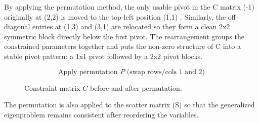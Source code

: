 By applying the permutation method, the only usable pivot in the C matrix (-1) originally at (2,2) is moved to the top-left position (1,1) . Similarly, the off-diagonal entries at (1,3) and (3,1) are relocated so they form a clean 2x2 symmetric block directly below the first pivot. The rearrangement groups the constrained parameters together and puts the non-zero structure of C into a stable pivot pattern: a 1x1 pivot followed by a 2x2 pivot blocks. 

\begin{figure}[h!]
\centering


\vspace{0.5cm}

\[
\text{Apply permutation } P \text{ (swap rows/cols 1 and 2)}
\]

\vspace{0.5cm}


\caption{Constraint matrix $C$ before and after permutation.}
\end{figure}

The permutation is also applied to the scatter matrix (S) so that the generalized eigenproblem remains consistent after reordering the variables. 

